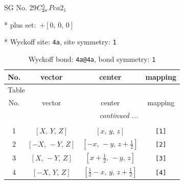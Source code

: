 \documentclass[fleqn,8pt]{jsarticle}
\begin{document}
\setcounter{MaxMatrixCols}{32}

\renewcommand{\tablename}{Table~}
\renewcommand{\figurename}{Figure~}
\begin{center}
\LARGE
SG No. 29\quad$C_{\rm 2v}^{5}$\quad$Pca2_1$\quad[ orthorhombic ]
\end{center}

* plus set:\,\,\,$+\left[ 0,\, 0,\, 0 \right]$


* Wyckoff site: {\tt 4a}, site symmetry: {\tt 1}
\renewcommand{\arraystretch}{1.2}
\begin{longtable}{cccc}
\caption{Wyckoff bond: {\tt 4a@4a}, bond symmetry: {\tt 1}}
 \\
 \hline \hline
No. & vector & center & mapping \\ \hline \endfirsthead

\multicolumn{3}{l}{\tablename\ \thetable{}} \\
 \hline \hline
No. & vector & center & mapping \\ \hline \endhead

 \hline \hline
\multicolumn{3}{r}{\footnotesize\it continued ...} \\ \endfoot

 \hline \hline
\multicolumn{3}{r}{} \\ \endlastfoot

1 & $\left[ X,\, Y,\, Z \right]$ & $\left[ x,\, y,\, z \right]$ & {\tt [1]} \\ \hline
2 & $\left[ - X,\, - Y,\, Z \right]$ & $\left[ - x,\, - y,\, z + \frac{1}{2} \right]$ & {\tt [2]} \\ \hline
3 & $\left[ X,\, - Y,\, Z \right]$ & $\left[ x + \frac{1}{2},\, - y,\, z \right]$ & {\tt [3]} \\ \hline
4 & $\left[ - X,\, Y,\, Z \right]$ & $\left[ \frac{1}{2} - x,\, y,\, z + \frac{1}{2} \right]$ & {\tt [4]} \\
\end{longtable}
\end{document}
